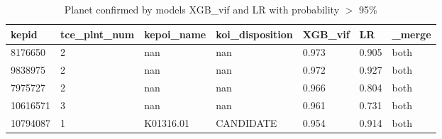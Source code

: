 \begin{table}[!htbp]
 \centering
 \caption{Planet confirmed by models XGB\_vif and LR with probability $>$ 95\%}
 \label{dataXGBvifLRcreftab} 
  \begin{tabular}
{| 
 p{}| 
 p{}| 
 p{}| 
 p{}| 
 p{}| 
 p{}| 
 p{}| 
}\hline 
\textbf{kepid} &\textbf{tce\_plnt\_num} &\textbf{kepoi\_name} &\textbf{koi\_disposition} &\textbf{XGB\_vif} &\textbf{LR} &\textbf{\_merge} \\ \hline 
8176650 &2 &nan &nan &0.973 &0.905 &both \\ \hline 
9838975 &2 &nan &nan &0.972 &0.927 &both \\ \hline 
7975727 &2 &nan &nan &0.966 &0.804 &both \\ \hline 
10616571 &3 &nan &nan &0.961 &0.731 &both \\ \hline 
10794087 &1 &K01316.01 &CANDIDATE &0.954 &0.914 &both \\ \hline 
\end{tabular} 
\end{table}